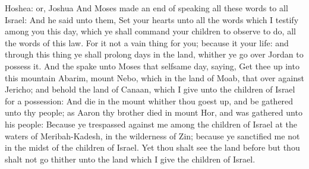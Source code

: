 {{Hoshea: or, Joshua}
And
Moses made an
end of
speaking all these
words to all
Israel:
And he
said unto them,
Set your
hearts unto all the
words which I
testify among you this
day, which ye shall
command your
children to
observe to
do, all the
words of this
law.
For it
{} not a
vain
thing for you; because it
{} your
life: and through this
thing ye shall
prolong
{}
days in the
land, whither ye go
over
Jordan to
possess it.
And the
{}
spake unto
Moses that
selfsame
day,
saying,
Get thee
up into this
mountain
Abarim,
{}
mount
Nebo, which
{} in the
land of
Moab, that
{} over
against
Jericho; and
behold the
land of
Canaan, which I
give unto the
children of
Israel for a
possession:
And
die in the
mount whither thou goest
up, and be
gathered unto thy
people; as
Aaron thy
brother
died in
mount
Hor, and was
gathered unto his
people:
Because ye
trespassed against me
among the
children of
Israel at the
waters of
Meribah-Kadesh, in the
wilderness of
Zin; because ye
sanctified me not in the
midst of the
children of
Israel.
Yet thou shalt
see the
land before
{} but thou shalt not
go thither unto the
land which I
give the
children of
Israel.

}
